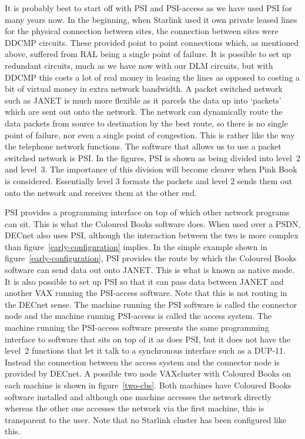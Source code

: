 It is probably best to start off with PSI and PSI-access as we have used PSI
for many years now. In the beginning, when Starlink used it own private leased
lines for the physical connection between sites, the connection between sites
were DDCMP circuits. These provided point to point connections which, as
mentioned above, suffered from RAL being a single point of failure. It is
possible to set up redundant circuits, much as we have now with our DLM
circuits, but with DDCMP this costs a lot of real money in leasing the lines as
opposed to costing a bit of virtual money in extra network bandwidth. A packet
switched network such as JANET is much more flexible as it parcels the data up
into `packets' which are sent out onto the network. The network can dynamically
route the data packets from source to destination by the best route, so there
is no single point of failure, nor even a single point of congestion. This is
rather like the way the telephone network functions. The software that allows
us to use a packet switched network is PSI. In the figures, PSI is shown as
being divided into level~2 and level~3. The importance of this division will
become clearer when Pink Book is considered. Essentially level 3 formats the
packets and level 2 sends them out onto the network and receives them at the
other end.

PSI provides a programming interface on top of which other network programs can
sit. This is what the Coloured Books software does. When used over a PSDN,
DECnet also uses PSI, although the interaction between the two is more complex
than figure~\ref{early-configuration} implies. In the simple example shown in
figure~\ref{early-configuration}, PSI provides the route by which the Coloured
Books software can send data out onto JANET. This is what is known as native
mode. It is also possible to set up PSI so that it can pass data between JANET
and another VAX running the PSI-access software. Note that this is not routing
in the DECnet sense. The machine running the PSI software is called the
connector node and the machine running PSI-access is called the access system.
The machine running the PSI-access software presents the same programming
interface to software that sits on top of it as does PSI, but it does not have
the level~2 functions that let it talk to a synchronous interface such as a
DUP-11. Instead the connection between the access system and the connector node
is provided by DECnet. A possible two node VAXcluster with Coloured Books on
each machine is shown in figure~\ref{two-cbs}. Both machines have Coloured
Books software installed and although one machine accesses the network directly
whereas the other one accesses the network via the first machine, this is
transparent to the user. Note that no Starlink cluster has been configured like
this.

